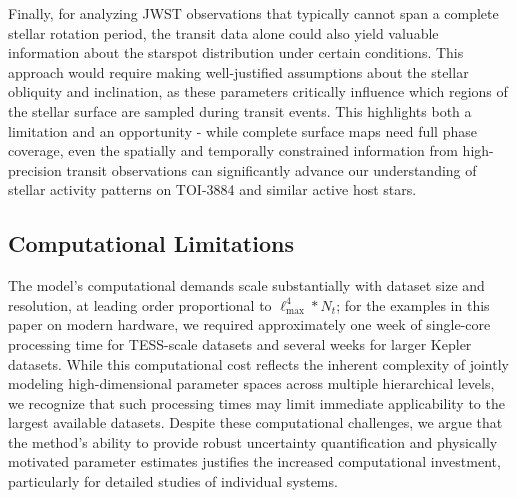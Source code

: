 \documentclass[twocolumn]{aastex631}
\newcommand{\sabinasays}[1]{{\color{purple}#1}}
\begin{document}
Finally, for analyzing JWST observations that typically cannot span a complete stellar rotation period,
the transit data alone could also yield valuable information about the starspot distribution under certain conditions. 
This approach would require making well-justified assumptions about the stellar obliquity and inclination, as these 
parameters critically influence which regions of the stellar surface are sampled during transit events. This highlights both 
a limitation and an opportunity - while complete surface maps need full phase coverage, 
even the spatially and temporally constrained information from high-precision transit observations can significantly 
advance our understanding of stellar activity patterns on TOI-3884 and similar active host stars.

\sabinasays{\subsection{Computational Limitations}
The model's computational demands scale substantially with dataset size and resolution, at leading order proportional to $\ell_\mathrm{max}^4 * N_t$; for the examples in this paper on modern hardware, we  
required approximately one week of single-core processing time for TESS-scale datasets and several weeks for 
larger Kepler datasets. While this computational cost reflects the inherent complexity of jointly modeling high-dimensional 
parameter spaces across multiple hierarchical levels, we recognize that such processing times may limit immediate 
applicability to the largest available datasets. Despite these computational challenges, we argue that the method's 
ability to provide robust uncertainty quantification and physically motivated parameter estimates justifies the 
increased computational investment, particularly for detailed studies of individual systems.}
\end{document}
